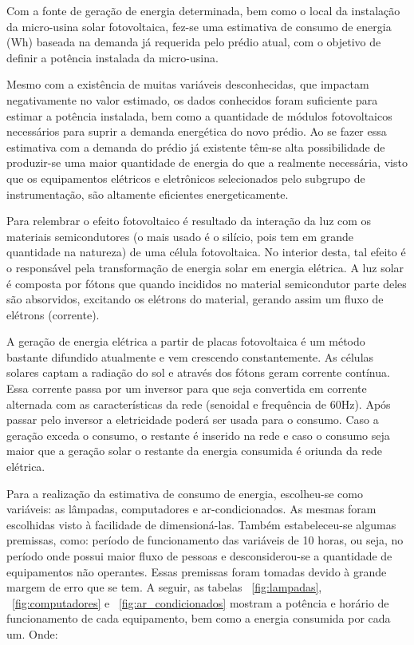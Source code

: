 Com a fonte de geração de energia determinada, bem como o local da instalação da micro-usina solar fotovoltaica, fez-se uma estimativa de consumo de energia (Wh) baseada na demanda já requerida pelo prédio atual, com o  objetivo de definir a potência instalada da micro-usina.

Mesmo com a existência de muitas variáveis desconhecidas, que impactam negativamente no valor estimado, os dados conhecidos foram suficiente para estimar a potência instalada, bem como a quantidade de módulos fotovoltaicos necessários para suprir a demanda energética do novo prédio. Ao se fazer essa estimativa com a demanda do prédio já existente têm-se  alta possibilidade de produzir-se uma maior quantidade de energia do que a realmente necessária, visto que os equipamentos elétricos e eletrônicos selecionados pelo subgrupo de instrumentação, são altamente eficientes energeticamente.

Para relembrar o efeito fotovoltaico é resultado da interação da luz com os materiais semicondutores (o mais usado é o silício, pois tem em grande quantidade na natureza) de uma célula fotovoltaica. No interior desta, tal efeito é o responsável pela transformação de energia solar em energia elétrica. A luz solar é composta por fótons que quando incididos no material semicondutor parte deles são absorvidos, excitando os elétrons do material, gerando assim um fluxo de elétrons (corrente). \cite{ideal}

A geração de energia elétrica a partir de placas fotovoltaica é um método bastante difundido atualmente e vem crescendo constantemente. As células solares captam a radiação do sol e através dos fótons geram corrente contínua. Essa corrente passa por um inversor para que seja convertida em corrente alternada com as características da rede (senoidal e frequência de 60Hz). Após passar pelo inversor a eletricidade poderá ser usada para o consumo. Caso a geração exceda o consumo, o restante é inserido na rede e caso o consumo seja maior que a geração solar o restante da energia consumida é oriunda da rede elétrica.

Para a realização da estimativa de consumo de energia, escolheu-se como variáveis: as lâmpadas, computadores e ar-condicionados. As mesmas foram escolhidas visto à facilidade de dimensioná-las. Também estabeleceu-se algumas premissas, como: período de funcionamento das variáveis de 10 horas, ou seja, no período onde possui maior fluxo de pessoas e desconsiderou-se a quantidade de equipamentos não operantes. Essas premissas foram tomadas devido à grande margem de erro que se tem. A seguir, as tabelas ~\ref{fig:lampadas}, ~\ref{fig:computadores} e ~\ref{fig:ar_condicionados} mostram a potência e horário de funcionamento de cada equipamento, bem como a energia consumida por cada um.
Onde:

